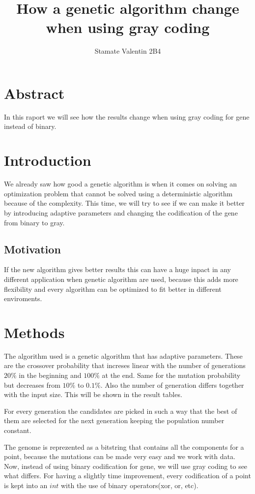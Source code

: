 \documentclass[12pt,leqno]{article}
\title{How a genetic algorithm change when using gray coding}
\author{Stamate Valentin 2B4}
\begin{document}
\maketitle

\section*{Abstract}

  In this raport we will see how the results change when using gray coding for gene instead of binary.

\section{Introduction}
  We already saw how good a genetic algorithm is when it comes on solving an optimization problem that cannot be solved using a deterministic algorithm because of the complexity.
  This time, we will try to see if we can make it better by introducing adaptive parameters and changing the codification of the gene from binary to gray.

\subsection{Motivation}
  If the new algorithm gives better results this can have a huge inpact in any different application when genetic algorithm are used, because this adds more flexibility and every algorithm can be
  optimized to fit better in different enviroments.

\section{Methods}
  
  The algorithm used is a genetic algorithm that has adaptive parameters. These are the crossover probability that increses linear with the number of generations 
  $20\%$ in the beginning and $100\%$ at the end. Same for the mutation probability but decreases from $10\%$ to $0.1\%$. Also the number of generation differs together with the input size.
  This will be shown in the result tables.
  
  For every generation the candidates are picked in such a way that the best of them are selected for the next generation keeping the population number constant. 
  
  The genome is reprezented as a bitstring that contains all the components for a point, because the mutations can be made very easy and we work with data.
  Now, instead of using binary codification for gene, we will use gray coding to see what differs.
  For having a slightly time improvement, every codification of a point is kept into an $int$ with the use of binary operators(xor, or, etc).
\end{document}
